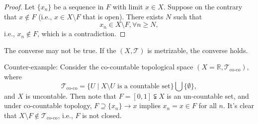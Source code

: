 \begin{proof}
Let $\{x_n\}$ be a sequence in $F$ with limit $x\in X$. 
Suppose on the contrary that $x\notin F$ 
(i.e., $x\in X\setminus F$ that is open). 
There exists $N$ such that
\[
x_n\in X\setminus F,\forall n\ge N,
\]
i.e., $x_n\notin F$, which is a contradiction.
\end{proof}
\begin{remark}
The converse may not be true. If the $(X,\mathcal{T})$ is metrizable, the converse holds.

Counter-example: Consider the co-countable topological space $(X=\mathbb{R},\mathcal{T}_{\text{co-co}})$, where 
\[
\mathcal{T}_{\text{co-co}}=
\{U\mid X\setminus U\text{ is a countable set}\}
\bigcup\{\emptyset\},
\]
and $X$ is uncontable. 
Then note that $F=[0,1]\subsetneqq X$ is an un-countable set, and under co-countable topology, $F\supseteq \{x_n\}\to x$ implies $x_n=x\in F$ for all $n$.
It's clear that $X\setminus F\notin \mathcal{T}_{\text{co-co}}$, i.e., $F$ is not closed.
\end{remark}

